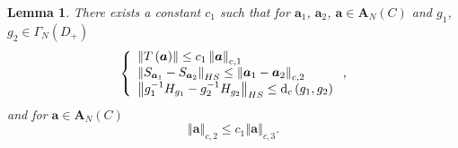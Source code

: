 \documentclass[a4paper]{article}%
\newtheorem{lemma}{Lemma}
\begin{document}
\begin{lemma}
\label{l2-3}There exists a constant $c_{1}$ such that for $\boldsymbol{a}_{1}%
$, $\boldsymbol{a}_{2}$, $\boldsymbol{a}\in\boldsymbol{A}_{N}\left(  C\right)
$ and $g_{1}$, $g_{2}\in\Gamma_{N}\left(  D_{+}\right)  $
\begin{equation}
\left\{
\begin{array}
[c]{l}%
\left\Vert T\left(  \boldsymbol{a}\right)  \right\Vert \leq c_{1}\left\Vert
\boldsymbol{a}\right\Vert _{c,1}\\
\left\Vert S_{\boldsymbol{a}_{1}}-S_{\boldsymbol{a}_{2}}\right\Vert _{HS}%
\leq\left\Vert \boldsymbol{a}_{1}-\boldsymbol{a}_{2}\right\Vert _{c,2}\\
\left\Vert g_{1}^{-1}H_{g_{1}}-g_{2}^{-1}H_{g_{2}}\right\Vert _{HS}%
\leq\mathrm{d}_{c}\left(  g_{1},g_{2}\right)
\end{array}
\right.  \text{,} \label{2-12}%
\end{equation}
and for $\boldsymbol{a}\in\boldsymbol{A}_{N}\left(  C\right)  $
\begin{equation}
\left\Vert \boldsymbol{a}\right\Vert _{c,2}\leq c_{1}\left\Vert \boldsymbol{a}%
\right\Vert _{c,3}\text{.} \label{2-13}%
\end{equation}

\end{lemma}
\end{document}
